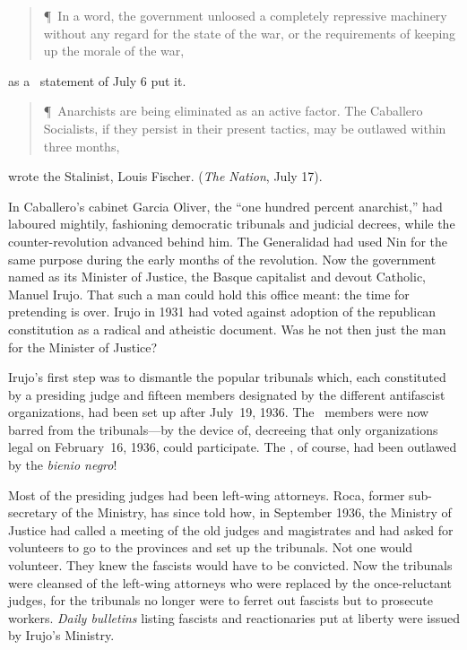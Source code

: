 \dinkus

\begin{quotation}
  \P\ In a word, the government unloosed a completely repressive machinery without any regard for the state of the war, or the requirements of keeping up the morale of the war,
\end{quotation}
as a \FAI\ statement of July 6 put it.

\begin{quotation}
  \P\ Anarchists are being eliminated as an active factor. The Caballero Socialists, if they persist in their present tactics, may be outlawed within three months,
\end{quotation}
wrote the Stalinist, Louis Fischer. (\emph{The Nation}, July 17).

\medskip

In Caballero’s cabinet Garcia Oliver, the ``one hundred percent anarchist,'' had laboured mightily, fashioning democratic tribunals and judicial decrees, while the counter-revolution advanced behind him. The Generalidad had used Nin for the same purpose during the early months of the revolution. Now the government named as its Minister of Justice, the Basque capitalist and devout Catholic, Manuel Irujo. That such a man could hold this office meant: the time for pretending is over. Irujo in 1931 had voted against adoption of the republican constitution as a radical and atheistic document. Was he not then just the man for the Minister of Justice?

Irujo’s first step was to dismantle the popular tribunals which, each constituted by a presiding judge and fifteen members designated by the different antifascist organizations, had been set up after July~19, 1936. The \FAI\ members were now barred from the tribunals---by the device of, decreeing that only organizations legal on February~16, 1936, could participate. The \FAI, of course, had been outlawed by the \emph{bienio negro}!

Most of the presiding judges had been left-wing attorneys. Roca, former sub-secretary of the Ministry, has since told how, in September 1936, the Ministry of Justice had called a meeting of the old judges and magistrates and had asked for volunteers to go to the provinces and set up the tribunals. Not one would volunteer. They knew the fascists would have to be convicted. Now the tribunals were cleansed of the left-wing attorneys who were replaced by the once-reluctant judges, for the tribunals no longer were to ferret out fascists but to prosecute workers. \emph{Daily bulletins} listing fascists and reactionaries put at liberty were issued by Irujo’s Ministry.

